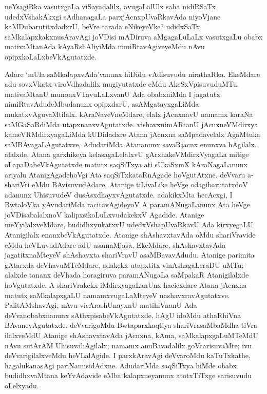 neYsagiRka vasutxgaLa viSayadalilx, avugaLalUlx saha nidiRSaTx udedxVshakAkxgi sAdhanagaLa parxjAcnxpUvaRkavAda niyoVjane kaMDubarutitxdadxrU, beVre tarada eNikeyeVke? udidxSaTx saMkalapxkakxnusAravAgi joVDisi mADiruva aMgagaLuLaLx vasutxgaLu obabx mativaMtanAda kAyaRshAliyiMda nimiRtavAgiveyeMdu nAvu opipxkoLaLxbeVkAgutatxde.

Adare `mUla saMkalapxvAda'vanunx hiDidu vAdisuvudu nirathaRka. EkeMdare adu sovxVkatx viroVdhadalilx mugiyutatxde eMdu AkeSxVpisuvuduMTu. mativaMtanU munonxVTavuLaLxvanU Ada obabxniMda I jagatutx nimiRtavAdudeMbudanunx opipxdarU, asAMgatayxgaLiMda mukatxvAguvaMtilalx. kAraNaveVneMdare, elalx jAcnxnavU namamx karaNa saMGaSaRdiMda utapxnanxvAgutatxde. vishavxnimARtanU jAcnxneVMdirxya kameVRMdirxya\-gaLiMda kUDidadxre Atana jAcnxna saMpadavelalx AgaMtuka saMBAvagaLAgutatxve, AdudariMda Atananunx savaRjacnx enunxva hAgilalx. alalxde, Atana garxhikeya kelasagaLelalxvU gArxha\-keVMdirxVyagaLa mitige oLapaDabeVkAgutatxde matutx saqSiTxya ati sUkaSxmX kAraNagaLanunx ariyalu AtanigAgadehoVgi Ata saqSiTxkataRnAgade hoVgutAtxne. deVvaru a-shariVri eMdu BAvisuvudAdare, Atanige tiLivaLike heVge odagibarutatxdoV adanunx Uhisu\-vudeV dusAsxdhayxvAgutatxde. adakikxMta hecAcxgi, I BwtaloVka yAvudariMda racita\-vAgideyoV A paramANugaLanunx Ata heVge joVDisabalalxnoV kalipxsikoLuLxvudakekxV Agadide. Atanige meYyilalxveMdare, budidhxyukatxvU udedxVshapUvaRkavU Ada kirxye\-gaLU Atani\-gilalx enanxbeVkAgutatxde. Atanige shAshavxtavAda oMdu shariVravide eMdu heVLuvudAdare adU asamaMjasa, EkeMdare, shAshavxtavAda jagatitxnaMteyeV shAshavxta shariVravU asaMBavavAdudu. Atanige parimita gAtarxda deVhavuMTeMdare, adakekx utapxtitx vinAsha\-gaLeraDU uMTu; alalxde tananx deVhada horagiruva paramANugaLa saMpakaR Ata\-nigilalxde hoVgutatxde. A shariVrakekx iMdirxyagaLanUnx hacicxdare Atana jAcnxna matutx saMkalapx\-gaLU namamxvugaLaMteyeV nashavxravAgutatxve. PalitAMshavAgi, nAvu vicArashUnayxnU matihiVnanU Ada deVvanobabxnanunx sAthxpisabeVkAgutatxde, hAgU idoMdu athaRhiVna BAvaneyAgutatxde. deVvarigoMdu Bwtaparxkaqtiya shariVrasaMbaMdha tiVra ilalxveMdU Atanige shAshavxtavAda jAcnxna, kAma, saMkalapxgaLuMTeMdU nAvu sutArAM UhisuvahAgilalx; namamx anuBavadalilx goVcarisuvaMte; ivu deVvarigilalxveMdu heVLalAgide. I parxkAravAgi deVvaroMdu kaTuTxkathe, hagalukanasAgi pariNamisidAdxne. AdudariMda saqSiTxya hiMde obabx budidhxvaMtana keYvAdavide eMba kalapxneyanunx atotxTiTxge sarisuvudu oLelxyadu.


